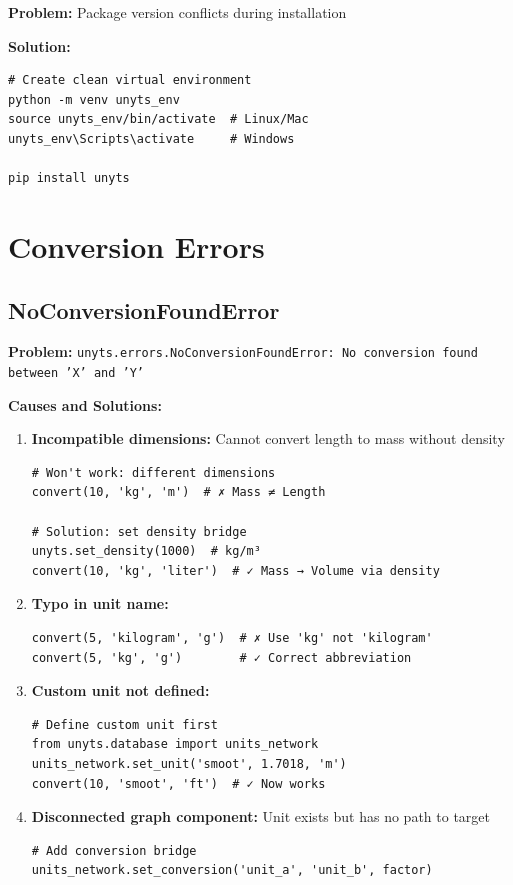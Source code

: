 \documentclass[11pt,a4paper]{report}
\begin{document}
\textbf{Problem:} Package version conflicts during installation

\textbf{Solution:}
\begin{lstlisting}[style=pythonstyle]
# Create clean virtual environment
python -m venv unyts_env
source unyts_env/bin/activate  # Linux/Mac
unyts_env\Scripts\activate     # Windows

pip install unyts
\end{lstlisting}

\section{Conversion Errors}

\subsection{NoConversionFoundError}

\textbf{Problem:} \texttt{unyts.errors.NoConversionFoundError: No conversion found between 'X' and 'Y'}

\textbf{Causes and Solutions:}

\begin{enumerate}
\item \textbf{Incompatible dimensions:} Cannot convert length to mass without density
\begin{lstlisting}[style=pythonstyle]
# Won't work: different dimensions
convert(10, 'kg', 'm')  # ✗ Mass ≠ Length

# Solution: set density bridge
unyts.set_density(1000)  # kg/m³
convert(10, 'kg', 'liter')  # ✓ Mass → Volume via density
\end{lstlisting}

\item \textbf{Typo in unit name:}
\begin{lstlisting}[style=pythonstyle]
convert(5, 'kilogram', 'g')  # ✗ Use 'kg' not 'kilogram'
convert(5, 'kg', 'g')        # ✓ Correct abbreviation
\end{lstlisting}

\item \textbf{Custom unit not defined:}
\begin{lstlisting}[style=pythonstyle]
# Define custom unit first
from unyts.database import units_network
units_network.set_unit('smoot', 1.7018, 'm')
convert(10, 'smoot', 'ft')  # ✓ Now works
\end{lstlisting}

\item \textbf{Disconnected graph component:} Unit exists but has no path to target
\begin{lstlisting}[style=pythonstyle]
# Add conversion bridge
units_network.set_conversion('unit_a', 'unit_b', factor)
\end{lstlisting}
\end{enumerate}
\end{document}
